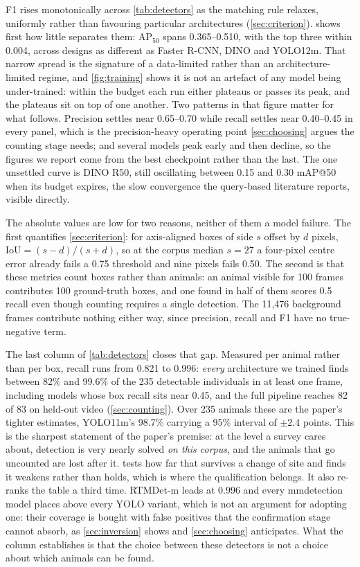 F1 rises monotonically across \cref{tab:detectors} as the matching rule relaxes, uniformly
rather than favouring particular architectures (\cref{sec:criterion}).
 shows first how little separates them: AP$_{50}$ spans 0.365--0.510,
with the top three within 0.004, across designs as different as Faster R-CNN, DINO and
YOLO12m. That narrow spread is the signature of a data-limited rather than an
architecture-limited regime, and \cref{fig:training} shows it is not an artefact of any
model being under-trained: within the budget each run either plateaus or passes its peak,
and the plateaus sit on top of one another. Two patterns in that figure matter for what
follows. Precision settles near 0.65--0.70 while recall settles near 0.40--0.45 in every
panel, which is the precision-heavy operating point \cref{sec:choosing} argues the counting
stage needs; and several models peak early and then decline, so the figures we report come
from the best checkpoint rather than the last. The one unsettled curve is DINO R50, still oscillating between 0.15 and 0.30 mAP@50 when its
budget expires, the slow convergence the query-based literature reports, visible directly.

The absolute values are low for two reasons, neither of them a model failure. The first
quantifies \cref{sec:criterion}: for axis-aligned boxes of side $s$ offset by $d$ pixels,
$\mathrm{IoU}=(s-d)/(s+d)$, so at the corpus median $s=27$ a four-pixel centre error already
fails a 0.75 threshold and nine pixels fails 0.50. The second is that these metrics count
boxes rather than animals: an animal visible for 100 frames contributes 100 ground-truth
boxes, and one found in half of them scores 0.5 recall even though counting requires a single
detection. The 11,476 background frames contribute nothing either way, since precision, recall
and F1 have no true-negative term.

The last column of \cref{tab:detectors} closes that gap. Measured per animal rather than per
box, recall runs from 0.821 to 0.996: \emph{every} architecture we trained finds between 82\%
and 99.6\% of the 235 detectable individuals in at least one frame, including models whose box recall
sits near 0.45, and the full pipeline reaches 82 of 83 on held-out video
(\cref{sec:counting}). Over 235 animals these are the paper's tighter estimates, YOLO11m's
98.7\% carrying a 95\% interval of $\pm2.4$ points. This is the sharpest statement of the
paper's premise: at the level a survey cares about, detection is very nearly solved
\emph{on this corpus}, and the animals that go uncounted are lost after it.  tests how far that
survives a change of site and finds it weakens rather than holds, which is where the
qualification belongs. It also re-ranks the table a third time. RTMDet-m leads at
0.996 and every mmdetection model places above every YOLO variant, which is not an argument
for adopting one: their coverage is bought with false positives that the confirmation stage
cannot absorb, as \cref{sec:inversion} shows and \cref{sec:choosing} anticipates. What the
column establishes is that the choice between these detectors is not a choice about which
animals can be found.


